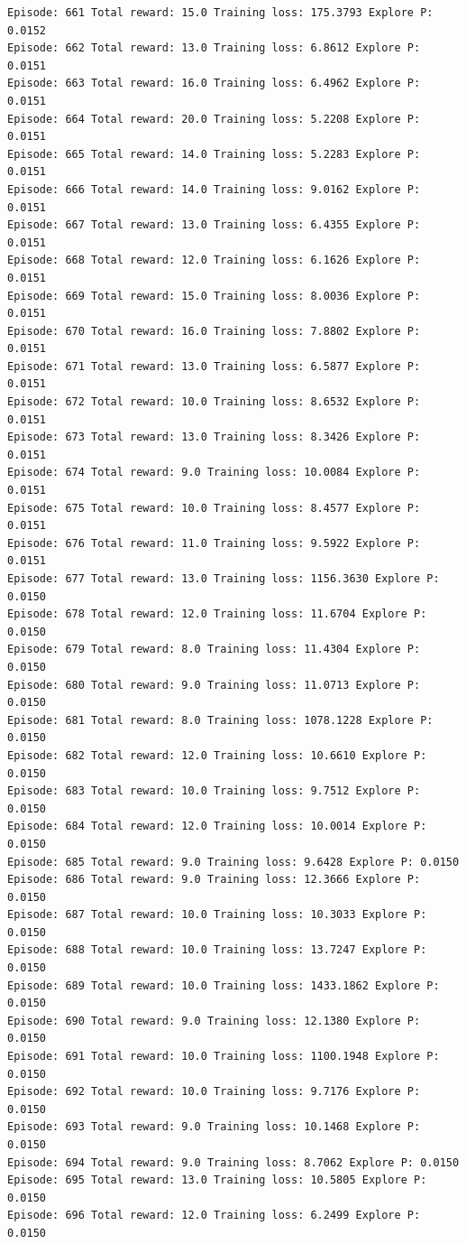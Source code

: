 \documentclass[11pt]{article}
\begin{document}
\begin{Verbatim}[commandchars=\\\{\}]
Episode: 661 Total reward: 15.0 Training loss: 175.3793 Explore P: 0.0152
Episode: 662 Total reward: 13.0 Training loss: 6.8612 Explore P: 0.0151
Episode: 663 Total reward: 16.0 Training loss: 6.4962 Explore P: 0.0151
Episode: 664 Total reward: 20.0 Training loss: 5.2208 Explore P: 0.0151
Episode: 665 Total reward: 14.0 Training loss: 5.2283 Explore P: 0.0151
Episode: 666 Total reward: 14.0 Training loss: 9.0162 Explore P: 0.0151
Episode: 667 Total reward: 13.0 Training loss: 6.4355 Explore P: 0.0151
Episode: 668 Total reward: 12.0 Training loss: 6.1626 Explore P: 0.0151
Episode: 669 Total reward: 15.0 Training loss: 8.0036 Explore P: 0.0151
Episode: 670 Total reward: 16.0 Training loss: 7.8802 Explore P: 0.0151
Episode: 671 Total reward: 13.0 Training loss: 6.5877 Explore P: 0.0151
Episode: 672 Total reward: 10.0 Training loss: 8.6532 Explore P: 0.0151
Episode: 673 Total reward: 13.0 Training loss: 8.3426 Explore P: 0.0151
Episode: 674 Total reward: 9.0 Training loss: 10.0084 Explore P: 0.0151
Episode: 675 Total reward: 10.0 Training loss: 8.4577 Explore P: 0.0151
Episode: 676 Total reward: 11.0 Training loss: 9.5922 Explore P: 0.0151
Episode: 677 Total reward: 13.0 Training loss: 1156.3630 Explore P: 0.0150
Episode: 678 Total reward: 12.0 Training loss: 11.6704 Explore P: 0.0150
Episode: 679 Total reward: 8.0 Training loss: 11.4304 Explore P: 0.0150
Episode: 680 Total reward: 9.0 Training loss: 11.0713 Explore P: 0.0150
Episode: 681 Total reward: 8.0 Training loss: 1078.1228 Explore P: 0.0150
Episode: 682 Total reward: 12.0 Training loss: 10.6610 Explore P: 0.0150
Episode: 683 Total reward: 10.0 Training loss: 9.7512 Explore P: 0.0150
Episode: 684 Total reward: 12.0 Training loss: 10.0014 Explore P: 0.0150
Episode: 685 Total reward: 9.0 Training loss: 9.6428 Explore P: 0.0150
Episode: 686 Total reward: 9.0 Training loss: 12.3666 Explore P: 0.0150
Episode: 687 Total reward: 10.0 Training loss: 10.3033 Explore P: 0.0150
Episode: 688 Total reward: 10.0 Training loss: 13.7247 Explore P: 0.0150
Episode: 689 Total reward: 10.0 Training loss: 1433.1862 Explore P: 0.0150
Episode: 690 Total reward: 9.0 Training loss: 12.1380 Explore P: 0.0150
Episode: 691 Total reward: 10.0 Training loss: 1100.1948 Explore P: 0.0150
Episode: 692 Total reward: 10.0 Training loss: 9.7176 Explore P: 0.0150
Episode: 693 Total reward: 9.0 Training loss: 10.1468 Explore P: 0.0150
Episode: 694 Total reward: 9.0 Training loss: 8.7062 Explore P: 0.0150
Episode: 695 Total reward: 13.0 Training loss: 10.5805 Explore P: 0.0150
Episode: 696 Total reward: 12.0 Training loss: 6.2499 Explore P: 0.0150

\end{Verbatim}
\end{document}
